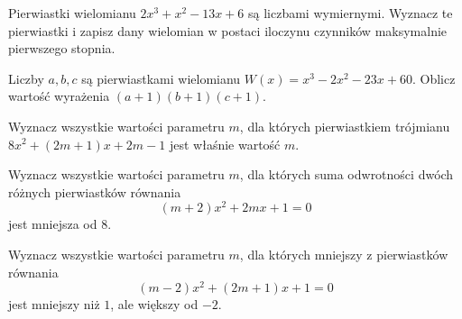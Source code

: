 \zadanie Pierwiastki wielomianu $2x^3 + x^2 - 13x + 6$ są liczbami wymiernymi. Wyznacz te pierwiastki i zapisz dany wielomian w postaci iloczynu czynników maksymalnie pierwszego stopnia. %

\zadanie Liczby $a, b, c$ są pierwiastkami wielomianu $W(x) = x^3 - 2x^2 - 23x + 60$. Oblicz wartość wyrażenia $(a + 1)(b + 1)(c + 1)$. %

\zadanie Wyznacz wszystkie wartości parametru $m$, dla których pierwiastkiem trójmianu $8x^2+(2m+1)x+2m-1$ jest właśnie wartość $m$. %

\zadanie Wyznacz wszystkie wartości parametru $m$, dla których suma odwrotności dwóch różnych pierwiastków równania \[ {(m+2)x^2+2mx+1=0} \] jest mniejsza od $8$.

\zadanie Wyznacz wszystkie wartości parametru $m$, dla których mniejszy z pierwiastków równania \[ (m-2)x^2+(2m+1)x+1=0 \] jest mniejszy niż $1$, ale większy od $-2$.

